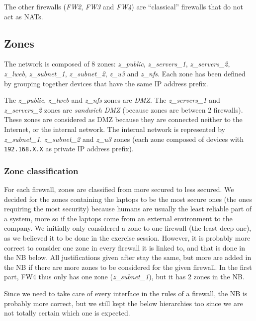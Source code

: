 \documentclass[a4paper, 12pt]{article}
\begin{document}
	The other firewalls (\emph{FW2}, \emph{FW3} and \emph{FW4}) are \enquote{classical} firewalls that do not act as NATs.
	
	\subsection{Zones}
	
	The network is composed of 8 zones: \emph{z\_public}, \emph{z\_servers\_1}, \emph{z\_servers\_2}, \emph{z\_lweb}, \emph{z\_subnet\_1}, \emph{z\_subnet\_2}, \emph{z\_u3} and \emph{z\_nfs}. Each zone has been defined by grouping together devices that have the same IP address prefix.
	
	The \emph{z\_public}, \emph{z\_lweb} and \emph{z\_nfs} zones are \emph{DMZ}. The \emph{z\_servers\_1} and \emph{z\_servers\_2} zones are \emph{sandwich DMZ} (because zones are between 2 firewalls). These zones are considered as DMZ because they are connected neither to the Internet, or the internal network. The internal network is represented by \emph{z\_subnet\_1}, \emph{z\_subnet\_2} and \emph{z\_u3} zones (each zone composed of devices with \texttt{192.168.X.X} as private IP address prefix).
	
	\subsubsection{Zone classification}
	
	For each firewall, zones are classified from more secured to less secured. We decided for the zones containing the laptops to be the most secure ones (the ones requiring the most security) because humans are usually the least reliable part of a system, more so if the laptops come from an external environment to the company. We initially only considered a zone to one firewall (the least deep one), as we believed it to be done in the exercise session. However, it is probably more correct to consider one zone in every firewall it is linked to, and that is done in the NB below. All justifications given after stay the same, but more are added in the NB if there are more zones to be considered for the given firewall. In the first part, FW4 thus only has one zone (\emph{z\_subnet\_1}), but it has 2 zones in the NB.
	
	Since we need to take care of every interface in the rules of a firewall, the NB is probably more correct, but we still kept the below hierarchies too since we are not totally certain which one is expected.
	
\end{document}
